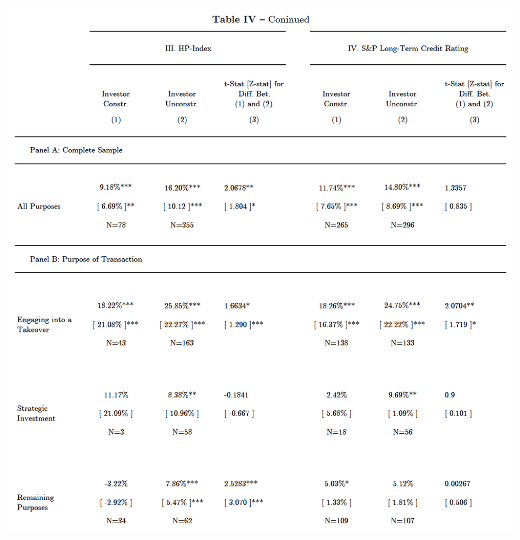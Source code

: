 \documentclass[12pt]{article}
\begin{document}
\pagebreak


\begin{table}[!htb]
	\centering
	\begin{adjustbox}{width=\textwidth}
		\includegraphics{Measures}
	\end{adjustbox}
\end{table}
\end{document}
